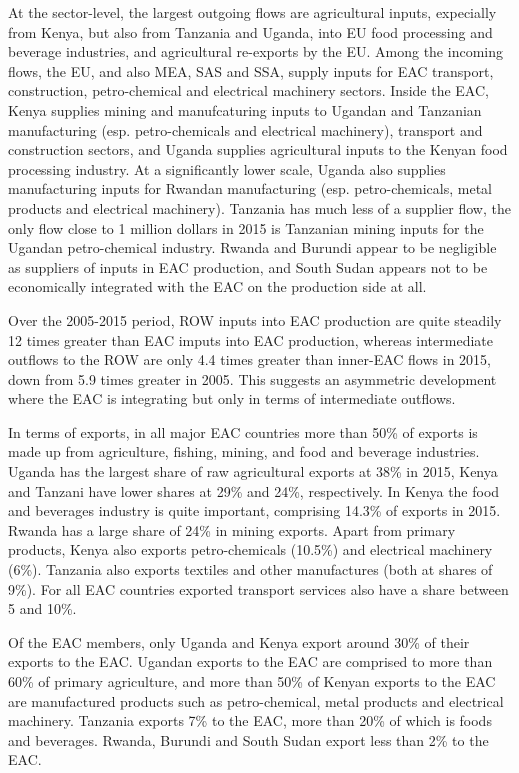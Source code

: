 \documentclass[a4paper]{article}
\begin{document}
At the sector-level, the largest outgoing flows are agricultural inputs, expecially from Kenya, but also from Tanzania and Uganda, into EU food processing and beverage industries, and agricultural re-exports by the EU. Among the incoming flows, the EU, and also MEA, SAS and SSA, supply inputs for EAC transport, construction, petro-chemical and electrical machinery sectors. Inside the EAC, Kenya supplies mining and manufcaturing inputs to Ugandan and Tanzanian manufacturing (esp. petro-chemicals and electrical machinery), transport and construction sectors, and Uganda supplies agricultural inputs to the Kenyan food processing industry.  At a significantly lower scale, Uganda also supplies manufacturing inputs for Rwandan manufacturing (esp. petro-chemicals, metal products and electrical machinery). Tanzania has much less of a supplier flow, the only flow close to 1 million dollars in 2015 is Tanzanian mining inputs for the Ugandan petro-chemical industry. Rwanda and Burundi appear to be negligible as suppliers of inputs in EAC production, and South Sudan appears not to be economically integrated with the EAC on the production side at all. \newline

Over the 2005-2015 period, ROW inputs into EAC production are quite steadily 12 times greater than EAC imputs into EAC production, whereas intermediate outflows to the ROW are only 4.4 times greater  than inner-EAC flows in 2015, down from 5.9 times greater in 2005. This suggests an asymmetric development where the EAC is integrating but only in terms of intermediate outflows. \newline

In terms of exports, in all major EAC countries more than 50\% of exports is made up from agriculture, fishing, mining, and food and beverage industries. Uganda has the largest share of raw agricultural exports at 38\% in 2015, Kenya and Tanzani have lower shares at 29\% and 24\%, respectively. In Kenya the food and beverages industry is quite important, comprising 14.3\% of exports in 2015. Rwanda has a large share of 24\% in mining exports. Apart from primary products, Kenya also exports petro-chemicals (10.5\%) and electrical machinery (6\%). Tanzania also exports textiles and other manufactures (both at shares of 9\%). For all EAC countries exported transport services also have a share between 5 and 10\%. \newline

Of the EAC members, only Uganda and Kenya export around 30\% of their exports to the EAC. Ugandan exports to the EAC are comprised to more than 60\% of primary agriculture, and more than 50\% of Kenyan exports to the EAC are manufactured products such as petro-chemical, metal products and electrical machinery. Tanzania exports 7\% to the EAC, more than 20\% of which is foods and beverages. Rwanda, Burundi and South Sudan export less than 2\% to the EAC.  \newline 
\end{document}
